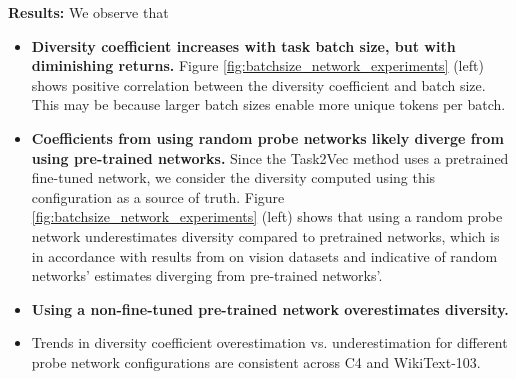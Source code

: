 \textbf{Results:} We observe that
\begin{itemize} %
    \item \textbf{Diversity coefficient increases with task batch size, but with diminishing returns.} 
    Figure \ref{fig:batchsize_network_experiments} (left) shows positive correlation between the diversity coefficient and batch size. 
    This may be because larger batch sizes enable more unique tokens per batch.
    \item \textbf{Coefficients from using random probe networks likely diverge from using pre-trained networks.} 
    Since the Task2Vec method \citep{task2vec} uses a pretrained fine-tuned network, we consider the diversity computed using this configuration as a source of truth. 
    Figure \ref{fig:batchsize_network_experiments} (left) shows that using a random probe network underestimates diversity compared to pretrained networks, which is in accordance with results from \cite{diversity} on vision datasets and indicative of random networks' estimates diverging from pre-trained networks'. 
    \item \textbf{Using a non-fine-tuned pre-trained network overestimates diversity.} 
    \item Trends in diversity coefficient overestimation vs. underestimation for different probe network configurations are consistent across C4 and WikiText-103.
\end{itemize}
